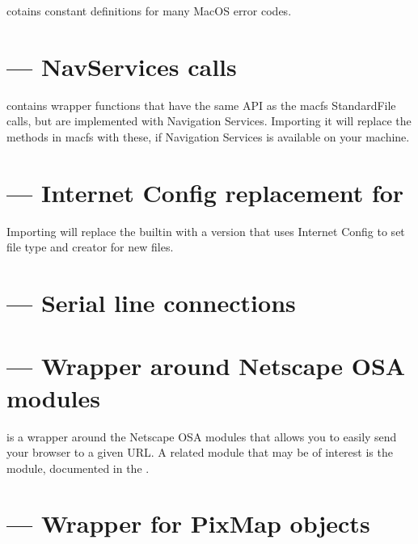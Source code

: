  cotains constant definitions for many MacOS error codes.


\section{ --- NavServices calls}


 contains wrapper functions that have the same API as the macfs 
StandardFile calls, but are implemented with Navigation Services. Importing it 
will replace the methods in macfs with these, if Navigation Services is 
available on your machine.


\section{ --- Internet Config replacement for }

Importing  will replace the builtin 
with a version that uses Internet Config to set file type and creator
for new files.


\section{ --- Serial line connections}


\section{ --- Wrapper around Netscape OSA modules}

 is a wrapper around the Netscape OSA modules that
allows you to easily send your browser to a given URL.  A related
module that may be of interest is the  module,
documented in the .


\section{ --- Wrapper for PixMap objects}

